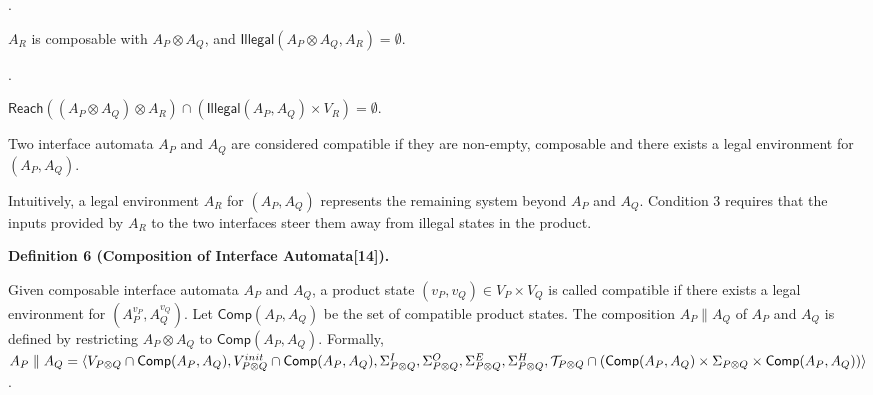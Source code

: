 \documentclass[10pt,a4paper]{article}
\begin{document}
 
 
\par{}. 
 
$A_{R}$ is composable with $A_{P}\otimes A_{Q}$, and $\mathsf{Illegal}(A_{P}\otimes A_{Q},A_{R})=\emptyset$.\par
 
 
 
\par{}. 
 
$\mathsf{Reach}((A_{P}\otimes A_{Q})\otimes A_{R})\cap(\mathsf{Illegal}(A_{P},A_{Q})\times V_{R})=\emptyset$.\par
 
 
  
 
 
Two interface automata $A_{P}$ and $A_{Q}$ are considered compatible if they are non-empty, composable and there exists a legal environment for $(A_{P},A_{Q})$.\par
 
 
 
 
Intuitively, a legal environment $A_{R}$ for $(A_{P},A_{Q})$ represents the remaining system beyond $A_{P}$ and $A_{Q}$. Condition 3 requires that the inputs provided by $A_{R}$ to the two interfaces steer them away from illegal states in the product.\par
 
 
 
\par\medskip\noindent\textbf{Definition 6 (Composition of Interface Automata[14]).}\par
 
 
Given composable interface automata $A_{P}$ and $A_{Q}$, a product state $(v_{P},v_{Q})\in V_{P}\times V_{Q}$ is called compatible if there exists a legal environment for $(A_{P}^{v_{P}},A_{Q}^{v_{Q}})$. Let $\mathsf{Comp}(A_{P},A_{Q})$ be the set of compatible product states. The composition $A_{P}\parallel A_{Q}$ of $A_{P}$ and $A_{Q}$ is defined by restricting $A_{P}\otimes A_{Q}$ to $\mathsf{Comp}(A_{P},A_{Q})$. Formally, $A_{P}\parallel A_{Q}=\langle V_{P\otimes Q}\cap\mathsf{Comp}(A_{P},A_{Q}),V_{P\otimes Q}^{init}\cap\mathsf{Comp}(A_{P},A_{Q}),\Sigma_{P\otimes Q}^{I},\Sigma_{P\otimes Q}^{O},\Sigma_{P\otimes Q}^{E},\\
\Sigma_{P\otimes Q}^{H},\mathcal{T}_{P\otimes Q}\cap(\mathsf{Comp}(A_{P},A_{Q})\times\Sigma_{P\otimes Q}\times\mathsf{Comp}(A_{P},A_{Q}))\rangle$.\par
 
\end{document}
